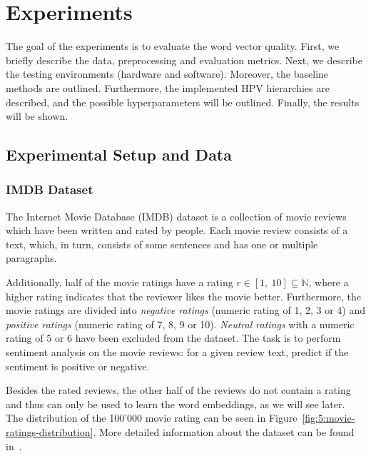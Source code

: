 \chapter{Experiments}\label{experiments}

The goal of the experiments is to evaluate the word vector quality. First, we briefly describe the data, preprocessing and evaluation metrics. Next, we describe the testing environments (hardware and software). Moreover, the baseline methods are outlined. Furthermore, the implemented HPV hierarchies are described, and the possible hyperparameters will be outlined. Finally, the results will be shown.

\section{Experimental Setup and Data}\label{experimental-setup-and-data}

\subsection{IMDB Dataset}\label{imdb-dataset}

The Internet Movie Database (IMDB) dataset is a collection of movie reviews which have been written and rated by people. Each movie review consists of a text, which, in turn, consists of some sentences and has one or multiple paragraphs.

Additionally, half of the movie ratings have a rating $r \in [1,\ 10] \subseteq \mathbb{N}$, where a higher rating indicates that the reviewer likes the movie better. Furthermore, the movie ratings are divided into \emph{negative ratings} (numeric rating of 1, 2, 3 or 4) and \emph{positive ratings} (numeric rating of 7, 8, 9 or 10). \emph{Neutral ratings} with a numeric rating of 5 or 6 have been excluded from the dataset. The task is to perform sentiment analysis on the movie reviews: for a given review text, predict if the sentiment is positive or negative.

Besides the rated reviews, the other half of the reviews do not contain a rating and thus can only be used to learn the word embeddings, as we will see later. The distribution of the 100'000 movie rating can be seen in Figure~\ref{fig:5:movie-ratings-distribution}. More detailed information about the dataset can be found in~\cite{Maas2011}.

